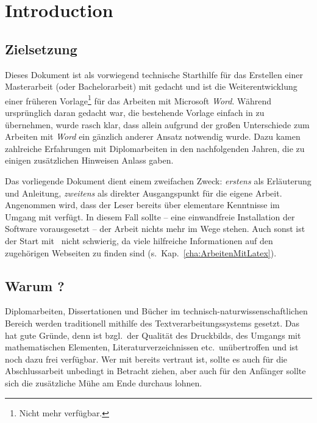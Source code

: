 \chapter{Introduction}
\label{cha:Introduction}

\section{Zielsetzung}
Dieses Dokument ist als vorwiegend technische Starthilfe für das
Erstellen einer Masterarbeit (oder Bachelorarbeit) mit \latex
gedacht und ist die Weiterentwicklung einer früheren
Vorlage\footnote{Nicht mehr verfügbar.} für das Arbeiten mit
Microsoft \emph{Word}. Während ursprünglich daran gedacht war, die
bestehende Vorlage einfach in \latex zu übernehmen, wurde rasch
klar, dass allein aufgrund der großen Unterschiede zum Arbeiten
mit \emph{Word} ein gänzlich anderer Ansatz notwendig wurde. Dazu
kamen zahlreiche Erfahrungen mit Diplomarbeiten in den
nachfolgenden Jahren, die zu einigen zusätzlichen Hinweisen Anlass gaben.

Das vorliegende Dokument dient einem zweifachen Zweck: 
\emph{erstens} als Erläuterung und Anleitung, \emph{zweitens} als
direkter Ausgangspunkt für die eigene Arbeit. Angenommen wird,
dass der Leser bereits über elementare Kenntnisse im Umgang mit
\latex verfügt. In diesem Fall sollte -- eine einwandfreie
Installation der Software vorausgesetzt -- der Arbeit nichts mehr
im Wege stehen. Auch sonst ist der Start mit \latex\ nicht
schwierig, da viele hilfreiche Informationen auf den zugehörigen
Webseiten zu finden sind (s.\ Kap.~\ref{cha:ArbeitenMitLatex}).





\section{Warum {\latex}?}

Diplomarbeiten, Dissertationen und Bücher im
technisch-natur\-wissen\-schaft\-lichen Bereich werden
traditionell mithilfe des Textverarbeitungssystems \latex
\cite{Lamport1994, Lamport1995} gesetzt. Das hat gute Gründe, denn
\latex ist bzgl.\ der Qualität des Druckbilds, des Umgangs mit
mathematischen Elementen, Literaturverzeichnissen etc.\
unübertroffen und ist noch dazu frei verfügbar. Wer mit \latex
bereits vertraut ist, sollte es auch für die Abschlussarbeit
unbedingt in Betracht ziehen, aber auch für den Anfänger sollte
sich die zusätzliche Mühe am Ende durchaus lohnen.

